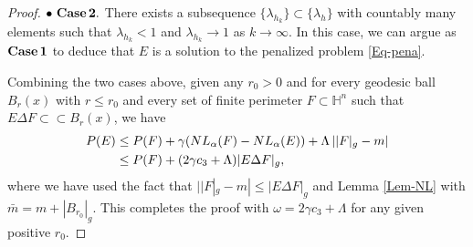 \documentclass[11pt,reqno]{amsart}
\theoremstyle{definition}
\theoremstyle{remark}
\numberwithin{equation}{section}
\renewcommand{\(}{\left(}
\renewcommand{\)}{\right)}
\renewcommand{\-}{\overline}
\begin{document}
\begin{proof}
	
	 \noindent$\bullet\,\,\bf{Case\,2.}$ There exists a subsequence $\{\lambda_{h_k}\}\subset \{\lambda_h\}$ with countably many elements such that $\lambda_{h_k}<1$ and $\lambda_{h_k}\to 1$ as $k\to\infty$. In this case, we can argue as $\bf{Case\,1}$ to deduce that $E$ is a solution to the penalized problem \eqref{Eq-pena}.

Combining the two cases above, given any $r_0>0$ and for every geodesic ball $B_r(x)$ with $r\leq r_0$ and every set of finite perimeter $F\subset\mathbb{H}^n$ such that $E\Delta F\subset\subset B_r(x)$, we have 
\begin{align}
	P(E)&\leq P(F)+\gamma(NL_{\alpha}(F)-NL_{\alpha}(E))+\Lambda\left||F|_g-m\right|\notag\\
	&\leq P(F)+(2\gamma c_3+\Lambda)|E\Delta F|_g,\label{In-Quasi6}
\end{align}
where we have used the fact that $||F|_g-m|\leq |E\Delta F|_g$ and Lemma \ref{Lem-NL} with $\bar{m}=m+|B_{r_0}|_g$. This completes the proof with $\omega=2\gamma c_3+\Lambda$ for any given positive $r_0$.
\end{proof}
\end{document}
